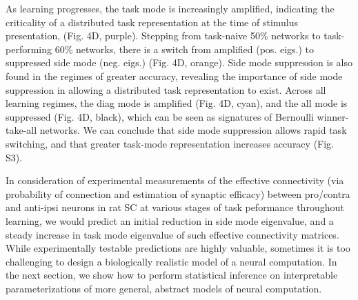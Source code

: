 \documentclass[11pt]{article}
\begin{document}
As learning progresses, the task mode is increasingly amplified, indicating the criticality of a distributed task representation at the time of stimulus presentation, (Fig. 4D, purple).  Stepping from task-naive 50\% networks to task-performing 60\% networks, there is a switch from amplified (pos. eigs.) to suppressed side mode (neg. eigs.) (Fig. 4D, orange).  Side mode suppression is also found in the regimes of greater accuracy, revealing the importance of side mode suppression in allowing a distributed task representation to exist.   Across all learning regimes, the diag mode is amplified (Fig. 4D, cyan), and the all mode is suppressed (Fig. 4D, black), which can be seen as signatures of Bernoulli winner-take-all networks.  We can conclude that side mode suppression allows rapid task switching, and that greater task-mode representation increases accuracy (Fig. S3).  

In consideration of experimental measurements of the effective connectivity (via probability of connection and estimation of synaptic efficacy) between pro/contra and anti-ipsi neurons in rat SC at various stages of task peformance throughout learning, we would predict an initial reduction in side mode eigenvalue, and a steady increase in task mode eigenvalue of such effective connectivity matrices.   While experimentally testable predictions are highly valuable, sometimes it is too challenging to design a biologically realistic model of a neural computation. In the next section, we show how to perform statistical inference on interpretable parameterizations of more general, abstract models of neural computation.
\end{document}
